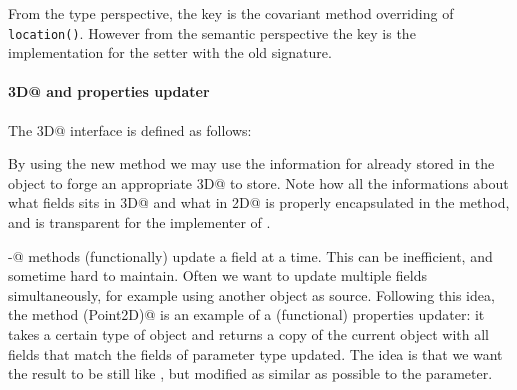 


\noindent From the type perspective, the key is the covariant method
overriding of \texttt{location()}. However from the semantic
perspective the key is the implementation for the setter with the old
signature.

\paragraph{\Q@Point3D@ and properties updater}
The \Q@Point3D@ interface is defined as follows:


\noindent By using the new \Q@with@ method we may use the information for
\Q@z@ already stored in the object to forge an appropriate \Q@Point3D@
to store.  Note how all the informations about what fields sits in
\Q@Point3D@ and what in \Q@Point2D@ is properly encapsulated in the
\Q@with@ method, and is transparent for the implementer of \Q@Bird@.

\Q@with-@ methods (functionally) update a field at a time.  This can be
inefficient, and sometime hard to maintain.  Often we want to update multiple
fields simultaneously, for example using another object as source.  Following
this idea, the method \Q@with(Point2D)@ is an example of a (functional)
properties updater: it takes a certain type of object and returns a copy of the
current object with all fields that match the fields of parameter type
updated. The idea is that we want the result to be still like \Q@this@, but
modified as similar as possible to the parameter.




